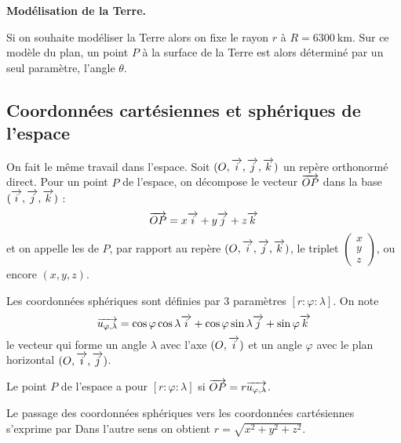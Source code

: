 \documentclass[class=report,crop=false]{standalone}
\begin{document}
\bigskip

\textbf{Modélisation de la Terre.}

Si on souhaite modéliser la Terre alors on fixe le rayon $r$ à $R
= \SI{6300}{\kilo\meter}$. Sur ce modèle du plan, 
un point $P$ à la surface de la Terre est alors
déterminé par un seul paramètre, l'angle $\theta$.




\subsection{Coordonnées cartésiennes et sphériques de l'espace}
\label{ssec:coord}

On fait le même travail dans l'espace. Soit $(O,\overrightarrow{i},\overrightarrow{j},\overrightarrow{k})$ un repère orthonormé direct.
Pour un point $P$ de l'espace, on décompose le vecteur $\overrightarrow{OP}$
dans la base $(\overrightarrow{i},\overrightarrow{j},\overrightarrow{k})$ :
$$\overrightarrow{OP} = x \overrightarrow{i}+y\overrightarrow{j}+z\overrightarrow{k}$$
et on appelle les  de $P$, par rapport au
repère $(O,\overrightarrow{i},\overrightarrow{j},\overrightarrow{k})$, le triplet 
$\left(\begin{smallmatrix}x\\y\\z\end{smallmatrix}\right)$, ou encore $(x,y,z)$.






Les coordonnées sphériques sont définies par $3$ paramètres 
$[r :\varphi :\lambda]$.
On note 
$$\overrightarrow{u_{\varphi,\lambda}}= \cos \varphi \cos \lambda \overrightarrow{i} + \cos \varphi \sin \lambda\overrightarrow{j} + \sin \varphi\overrightarrow{k}$$
le vecteur qui forme un angle $\lambda$ avec l'axe $(O,\overrightarrow{i})$ et
un angle $\varphi$ avec le plan horizontal $(O,\overrightarrow{i},\overrightarrow{j})$.




Le point $P$ de l'espace a pour  $[r :\varphi :\lambda]$ 
si $\overrightarrow{OP}=r\overrightarrow{u_{\varphi,\lambda}}$.

\bigskip

Le passage des coordonnées sphériques vers les coordonnées cartésiennes s'exprime par
Dans l'autre sens on obtient $r = \sqrt{x^2+y^2+z^2}$.
\end{document}
